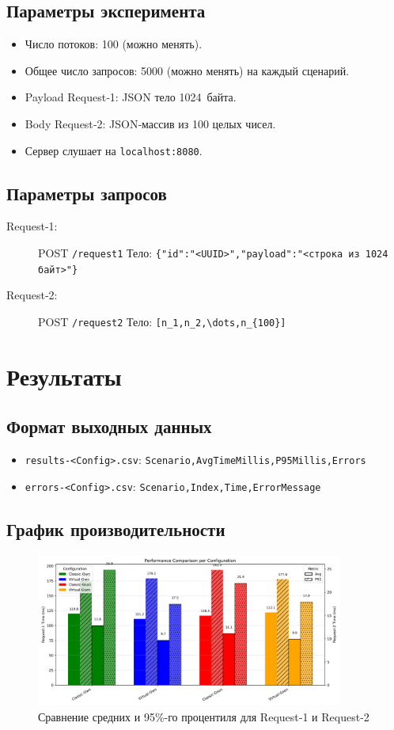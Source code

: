 \documentclass[areasetadvanced]{scrartcl}
\begin{document}
\subsection{Параметры эксперимента}
\begin{itemize}
  \item Число потоков: 100 (можно менять).
  \item Общее число запросов: 5000 (можно менять) на каждый сценарий.
  \item Payload Request‑1: JSON тело 1024 байта.
  \item Body Request‑2: JSON‑массив из 100 целых чисел.
  \item Сервер слушает на \verb|localhost:8080|.
\end{itemize}

\subsection{Параметры запросов}
\begin{description}
  \item[Request‑1:] POST \verb|/request1|  
    Тело: \verb|{"id":"<UUID>","payload":"<строка из 1024 байт>"}|
  \item[Request‑2:] POST \verb|/request2|  
    Тело: \verb|[n_1,n_2,\dots,n_{100}]|
\end{description}

\newpage
\section{Результаты}
\subsection{Формат выходных данных}
\begin{itemize}
  \item \texttt{results-<Config>.csv}: \texttt{Scenario,AvgTimeMillis,P95Millis,Errors}
  \item \texttt{errors-<Config>.csv}: \texttt{Scenario,Index,Time,ErrorMessage}
\end{itemize}

\subsection{График производительности}
\begin{figure}[H]
  \centering
  \includegraphics[width=0.9\textwidth]{image.png}
  \caption{Сравнение средних и 95\%-го процентиля для Request‑1 и Request‑2}
  \label{fig:perf}
\end{figure}
\end{document}
